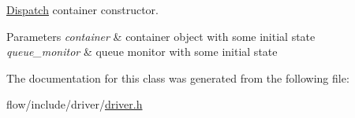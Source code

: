 \hyperlink{classflow_1_1_dispatch}{Dispatch} container constructor. 


\begin{DoxyParams}{Parameters}
{\em container} & container object with some initial state \\
\hline
{\em queue\+\_\+monitor} & queue monitor with some initial state \\
\hline
\end{DoxyParams}


The documentation for this class was generated from the following file\+:\begin{DoxyCompactItemize}
\item 
flow/include/driver/\hyperlink{driver_8h}{driver.\+h}\end{DoxyCompactItemize}
